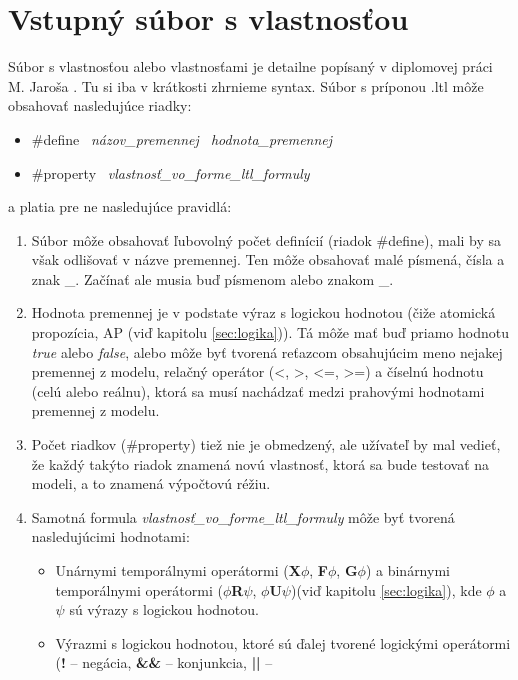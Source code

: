 \documentclass[11pt,final,oneside]{fithesis}
\begin{document}
\section{Vstupn\'y s\'ubor s vlastnos\v{t}ou}
\label{sec:propertyFile}
S\'ubor s vlastnos\v tou alebo vlastnos\v tami je detailne pop\'isan\'y v diplomovej pr\'aci M. Jaro\v sa \cite{Jaros-thesis}. Tu si iba v kr\'atkosti zhrnieme syntax. S\'ubor 
s pr\'iponou .ltl m\^ o\v ze obsahova\v t nasleduj\'uce riadky:
\begin{itemize}
\item \#define \ {\it n\'azov\_premennej \ hodnota\_premennej}
\item \#property \ {\it vlastnos\v t\_vo\_forme\_ltl\_formuly}
\end{itemize}
a platia pre ne nasleduj\'uce pravidl\'a:
\begin{enumerate}
\item S\'ubor m\^ o\v ze obsahova\v t \v lubovoln\'y po\v cet defin\'ici\'i (riadok \#define), mali by sa v\v sak odli\v sova\v t v n\'azve premennej. Ten m\^ o\v ze obsahova\v t
mal\'e p\'ismen\'a, \v c\'isla a znak \_. Za\v c\'ina\v t ale musia bu\v d p\'ismenom alebo znakom \_.
\item Hodnota premennej je v podstate v\'yraz s logickou hodnotou (\v ci\v ze atomick\'a propoz\'icia, AP (vi\v d kapitolu \ref{sec:logika})). T\'a m\^ o\v ze 
ma\v t bu\v d priamo
hodnotu {\it true} alebo {\it false}, alebo m\^ o\v ze by\v t tvoren\'a re\v tazcom obsahuj\'ucim meno nejakej premennej z modelu, rela\v cn\'y oper\'ator (<, >, <=, >=) a \v c\'iseln\'u 
hodnotu (cel\'u alebo re\'alnu), ktor\'a sa mus\'i nach\'adza\v t medzi prahov\'ymi hodnotami premennej z modelu.
\item Po\v cet riadkov (\#property) tie\v z nie je obmedzen\'y, ale u\v z\'ivate\v l by mal vedie\v t, \v ze ka\v zd\'y tak\'yto riadok znamen\'a nov\'u 
vlastnos\v t, ktor\'a sa bude testova\v t na modeli, a to znamen\'a v\'ypo\v ctov\'u r\'e\v ziu.
\item Samotn\'a formula {\it vlastnos\v t\_vo\_forme\_ltl\_formuly} m\^ o\v ze by\v t tvoren\'a nasleduj\'ucimi hodnotami:
\begin{itemize}
\item Un\'arnymi tempor\'alnymi oper\'atormi ({\bf X}$\phi$, {\bf F}$\phi$, {\bf G}$\phi$) a bin\'arnymi tempor\'alnymi oper\'atormi ($\phi${\bf R}$\psi$, 
$\phi${\bf U}$\psi$)(vi\v d kapitolu \ref{sec:logika}), kde $\phi$ a $\psi$ s\'u v\'yrazy s logickou hodnotou.
\item V\'yrazmi s logickou hodnotou, ktor\'e s\'u \v dalej tvoren\'e logick\'ymi oper\'atormi ({\bf !} -- neg\'acia, {\bf \&\&} -- konjunkcia, {\bf ||} -- 

\end{itemize}
\end{enumerate}
\end{document}
